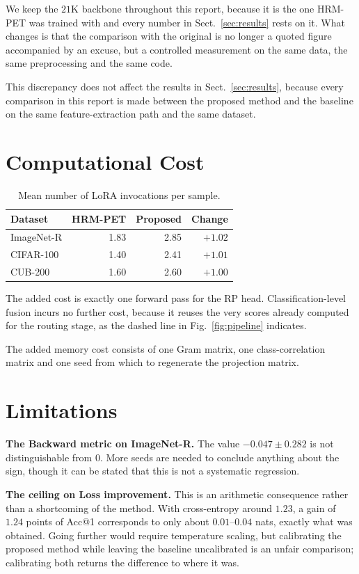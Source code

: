 \documentclass[11pt,a4paper]{article}
\begin{document}
We keep the $21$K backbone throughout this report, because it is the one HRM-PET
was trained with and every number in Sect.~\ref{sec:results} rests on it. What
changes is that the comparison with the original is no longer a quoted figure
accompanied by an excuse, but a controlled measurement on the same data, the
same preprocessing and the same code.

This discrepancy does not affect the results in Sect.~\ref{sec:results}, because
every comparison in this report is made between the proposed method and the
baseline on the same feature-extraction path and the same dataset.


\section{Computational Cost}

\begin{table}[htbp]
\centering
\caption{Mean number of LoRA invocations per sample.}
\label{tab:cost}
\begin{tabular}{lrrr}
\toprule
Dataset & HRM-PET & Proposed & Change \\
\midrule
ImageNet-R & 1.83 & 2.85 & $+1.02$ \\
CIFAR-100  & 1.40 & 2.41 & $+1.01$ \\
CUB-200    & 1.60 & 2.60 & $+1.00$ \\
\bottomrule
\end{tabular}
\end{table}

The added cost is exactly one forward pass for the RP head. Classification-level
fusion incurs no further cost, because it reuses the very scores already
computed for the routing stage, as the dashed line in
Fig.~\ref{fig:pipeline} indicates.

The added memory cost consists of one Gram matrix, one class-correlation matrix
and one seed from which to regenerate the projection matrix.

\section{Limitations}
\label{sec:limits}

\textbf{The Backward metric on ImageNet-R.} The value $-0.047 \pm 0.282$ is not
distinguishable from $0$. More seeds are needed to conclude anything about the
sign, though it can be stated that this is not a systematic regression.

\textbf{The ceiling on Loss improvement.} This is an arithmetic consequence
rather than a shortcoming of the method. With cross-entropy around $1.23$, a
gain of $1.24$ points of Acc@1 corresponds to only about $0.01$--$0.04$ nats,
exactly what was obtained. Going further would require temperature scaling, but
calibrating the proposed method while leaving the baseline uncalibrated is an
unfair comparison; calibrating both returns the difference to where it was.
\end{document}
